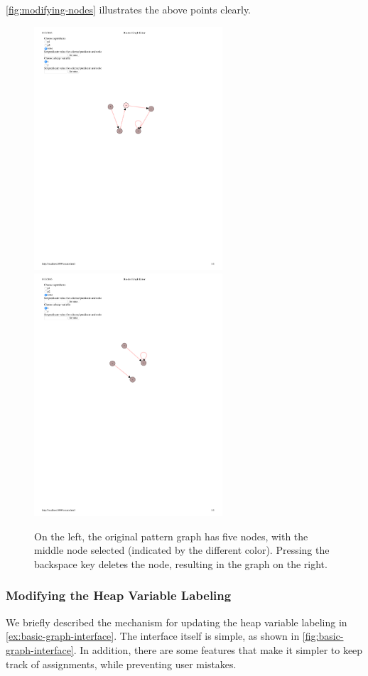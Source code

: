 \autoref{fig:modifying-nodes} illustrates the above points clearly.

\begin{figure}
  \centering
  \includegraphics[width=7cm]{fig/nodes-original.pdf}
  \includegraphics[width=7cm]{fig/nodes-changed.pdf}
  \caption{On the left, the original pattern graph has five nodes, with the middle node selected (indicated by the different color). Pressing the backspace key deletes the node, resulting in the graph on the right.
  }
  \label{fig:modifying-nodes}
\end{figure}

\subsubsection{Modifying the Heap Variable Labeling}
We briefly described the mechanism for updating the heap variable labeling in \autoref{ex:basic-graph-interface}. The interface itself is simple, as shown in \autoref{fig:basic-graph-interface}. In addition, there are some features that make it simpler to keep track of assignments, while preventing user mistakes.

